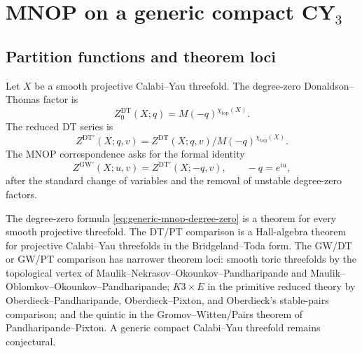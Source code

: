 \section{MNOP on a generic compact CY$_3$}
\label{sec:generic-mnop-cy3}

\providecommand{\PhiFA}{\Phi^{\mathrm{FA}}}
\providecommand{\Tr}{\mathrm{Tr}}
\providecommand{\Omg}{\Omega}
\providecommand{\Ethree}{E_3}
\providecommand{\Etwo}{E_2}
\providecommand{\Eone}{E_1}
\providecommand{\cC}{\mathcal{C}}
\providecommand{\cF}{\mathcal{F}}
\providecommand{\cM}{\mathcal{M}}
\providecommand{\cO}{\mathcal{O}}
\providecommand{\cT}{\mathcal{T}}
\providecommand{\Obs}{\mathrm{Obs}}
\providecommand{\hCS}{\mathrm{hCS}}
\providecommand{\Hilb}{\mathrm{Hilb}}
\providecommand{\Stab}{\mathrm{Stab}}
\providecommand{\DT}{\mathrm{DT}}
\providecommand{\GW}{\mathrm{GW}}
\providecommand{\PT}{\mathrm{PT}}
\providecommand{\BPS}{\mathrm{BPS}}
\providecommand{\CoHA}{\mathrm{CoHA}}
\providecommand{\Perf}{\mathrm{Perf}}
\providecommand{\Coh}{\mathrm{Coh}}
\providecommand{\End}{\mathrm{End}}
\providecommand{\red}{\mathrm{red}}
\providecommand{\vir}{\mathrm{vir}}
\providecommand{\kch}{\kappa_{\mathrm{ch}}}
\providecommand{\kcat}{\kappa_{\mathrm{cat}}}
\providecommand{\kBKM}{\kappa_{\mathrm{BKM}}}
\providecommand{\kfib}{\kappa_{\mathrm{fiber}}}
\providecommand{\chitop}{\chi_{\mathrm{top}}}
\providecommand{\CC}{\mathbb{C}}
\providecommand{\ZZ}{\mathbb{Z}}
\providecommand{\QQ}{\mathbb{Q}}

\subsection{Partition functions and theorem loci}

Let \(X\) be a smooth projective Calabi--Yau threefold.  The degree-zero
Donaldson--Thomas factor is
\begin{equation}
  Z^{\DT}_{0}(X;q)=M(-q)^{\chitop(X)}.
  \label{eq:generic-mnop-degree-zero}
\end{equation}
The reduced DT series is
\[
  Z^{\DT\prime}(X;q,v)
  =Z^{\DT}(X;q,v)/M(-q)^{\chitop(X)}.
\]
The MNOP correspondence asks for the formal identity
\begin{equation}
  Z^{\GW\prime}(X;u,v)=Z^{\DT\prime}(X;-q,v),
  \qquad -q=e^{iu},
  \label{eq:generic-mnop-formula}
\end{equation}
after the standard change of variables and the removal of unstable
degree-zero factors.

The degree-zero formula \eqref{eq:generic-mnop-degree-zero} is a
theorem for every smooth projective threefold.  The DT/PT comparison is
a Hall-algebra theorem for projective Calabi--Yau threefolds in the
Bridgeland--Toda form.  The GW/DT or GW/PT comparison has narrower
theorem loci: smooth toric threefolds by the topological vertex of
Maulik--Nekrasov--Okounkov--Pandharipande and
Maulik--Oblomkov--Okounkov--Pandharipande; \(K3\times E\) in the
primitive reduced theory by Oberdieck--Pandharipande, Oberdieck--Pixton,
and Oberdieck's stable-pairs comparison; and the quintic in the
Gromov--Witten/Pairs theorem of Pandharipande--Pixton.  A generic
compact Calabi--Yau threefold remains conjectural.

